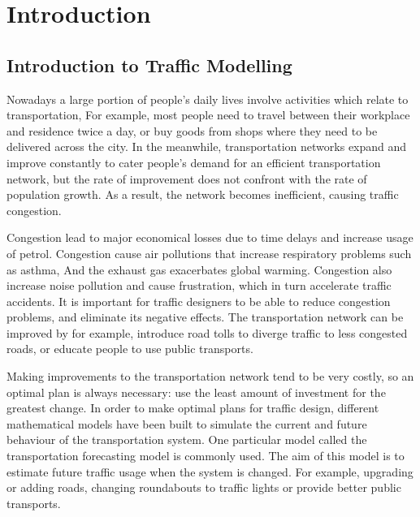 \chapter{Introduction}



\section{Introduction to Traffic Modelling}

Nowadays a large portion of people's daily lives involve activities which relate to transportation,
For example, most people need to travel between their workplace and residence twice a day,
or buy goods from shops where they need to be delivered across the city.
In the meanwhile, 
transportation networks expand and improve constantly to cater people's demand for an efficient transportation network,
but the rate of improvement does not confront with the rate of population growth.
As a result,
the network becomes inefficient, causing traffic congestion.

Congestion lead to major economical losses due to time delays and increase usage of petrol.
Congestion cause air pollutions that increase respiratory problems such as asthma, 
And the exhaust gas exacerbates global warming.
Congestion also increase noise pollution and cause frustration,
which in turn accelerate traffic accidents.
It is important for traffic designers to be able to reduce congestion problems,
and eliminate its negative effects.
The transportation network can be improved by for example,
introduce road tolls to diverge traffic to less congested roads,
or educate people to use public transports.

Making improvements to the transportation network tend to be very costly,
so an optimal plan is always necessary:
use the least amount of investment for the greatest change.
In order to make optimal plans for traffic design,
different mathematical models have been built to simulate the current and future behaviour of the transportation system.
One particular model called the transportation forecasting model is commonly used.
The aim of this model is to estimate future traffic usage when the system is changed.
For example, upgrading or adding roads, changing roundabouts to traffic lights or provide better public transports. 


